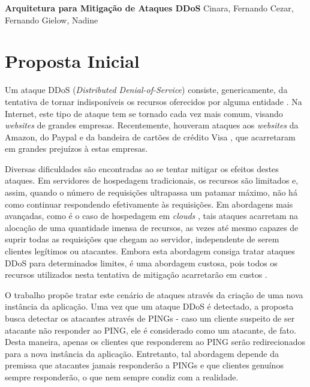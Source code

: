 \documentclass[a4paper, 11pt]{article}
\begin{document}
{
\begin{center}
{\LARGE \textbf{Arquitetura para Mitiga\c{c}\~{a}o de Ataques DDoS}}
\vskip 0.5cm
{\Large Cinara, Fernando Cezar, Fernando Gielow, Nadine}
\end{center}
}

\section{Proposta Inicial}

Um ataque DDoS (\emph{Distributed Denial-of-Service})
 consiste, genericamente, da tentativa de tornar indisponíveis
os recursos oferecidos por alguma entidade \cite{Zhang:11}. Na Internet, este
tipo de ataque tem se tornado cada vez mais comum, visando \emph{websites} de
grandes empresas. Recentemente, houveram ataques aos \emph{websites} da Amazon,
do Paypal e da bandeira de cartões de crédito Visa \cite{Zuckerman:10,ddosatks}, que
acarretaram em grandes prejuízos à estas empresas.

Diversas dificuldades são encontradas ao se tentar mitigar os efeitos destes
ataques. Em servidores de hospedagem tradicionais, os recursos são limitados e,
assim, quando o número de requisições ultrapassa um patamar máximo, não há como
continuar respondendo efetivamente às requisições. Em abordagens mais avançadas,
como é o caso de hospedagem em \emph{clouds} \cite{Zhang:10}, tais ataques
acarretam na alocação de uma quantidade imensa de recursos, as vezes até mesmo capazes de
suprir todas as requisições que chegam ao servidor, independente de serem
clientes legítimos ou atacantes. Embora esta abordagem consiga tratar ataques
DDoS para determinados limites, é uma abordagem custosa, pois todos os recursos
utilizados nesta tentativa de mitigação acarretar\~ao em custos
\cite{Soon:10}.

O trabalho \cite{Bakshi:10} prop\~oe tratar este cen\'ario de ataques através da
criação de uma nova instância da aplicação. Uma vez que um ataque DDoS é
detectado, a proposta busca detectar os atacantes através de PINGs -
caso um cliente suspeito de ser atacante não responder ao PING, ele é considerado como um
atacante, de fato. Desta maneira, apenas os clientes que responderem ao PING serão
redirecionados para a nova instância da aplicação. Entretanto, tal abordagem
depende da premissa que atacantes jamais responderão a PINGs e que clientes
genuínos sempre responderão, o que nem sempre condiz com a realidade. 
\end{document}
